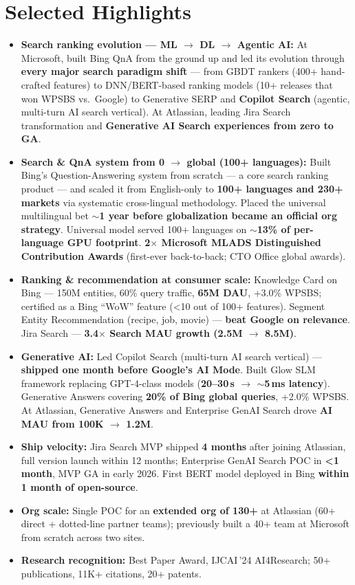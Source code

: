 \documentclass[10.5pt,letterpaper]{article}
\begin{document}
\section*{Selected Highlights}
\begin{itemize}
  \item \textbf{Search ranking evolution --- ML $\to$ DL $\to$ Agentic AI:} At Microsoft, built Bing QnA from the ground up and led its evolution through \textbf{every major search paradigm shift} — from GBDT rankers (400+ hand-crafted features) to DNN/BERT-based ranking models (10+ releases that won WPSBS vs.\ Google) to Generative SERP and \textbf{Copilot Search} (agentic, multi-turn AI search vertical). At Atlassian, leading Jira Search transformation and \textbf{Generative AI Search experiences from zero to GA}.
  \item \textbf{Search \& QnA system from 0 $\to$ global (100+ languages):} Built Bing's Question-Answering system from scratch — a core search ranking product — and scaled it from English-only to \textbf{100+ languages and 230+ markets} via systematic cross-lingual methodology. Placed the universal multilingual bet \textbf{$\sim$1 year before globalization became an official org strategy}. Universal model served 100+ languages on \textbf{$\sim$13\% of per-language GPU footprint}. \textbf{2$\times$ Microsoft MLADS Distinguished Contribution Awards} (first-ever back-to-back; CTO Office global awards).
  \item \textbf{Ranking \& recommendation at consumer scale:} Knowledge Card on Bing — 150M entities, 60\% query traffic, \textbf{65M DAU}, +3.0\% WPSBS; certified as a Bing ``WoW'' feature (<10 out of 100+ features). Segment Entity Recommendation (recipe, job, movie) — \textbf{beat Google on relevance}. Jira Search — \textbf{3.4$\times$ Search MAU growth (2.5M $\to$ 8.5M)}.
  \item \textbf{Generative AI:} Led Copilot Search (multi-turn AI search vertical) — \textbf{shipped one month before Google's AI Mode}. Built Glow SLM framework replacing GPT-4-class models (\textbf{20--30\,s $\to$ $\sim$5\,ms latency}). Generative Answers covering \textbf{20\% of Bing global queries}, +2.0\% WPSBS. At Atlassian, Generative Answers and Enterprise GenAI Search drove \textbf{AI MAU from 100K $\to$ 1.2M}.
  \item \textbf{Ship velocity:} Jira Search MVP shipped \textbf{4 months} after joining Atlassian, full version launch within 12 months; Enterprise GenAI Search POC in \textbf{<1 month}, MVP GA in early 2026. First BERT model deployed in Bing \textbf{within 1 month of open-source}.
  \item \textbf{Org scale:} Single POC for an \textbf{extended org of 130+} at Atlassian (60+ direct + dotted-line partner teams); previously built a 40+ team at Microsoft from scratch across two sites.
  \item \textbf{Research recognition:} Best Paper Award, IJCAI\,'24 AI4Research; 50+ publications, 11K+ citations, 20+ patents.
\end{itemize}
\end{document}
